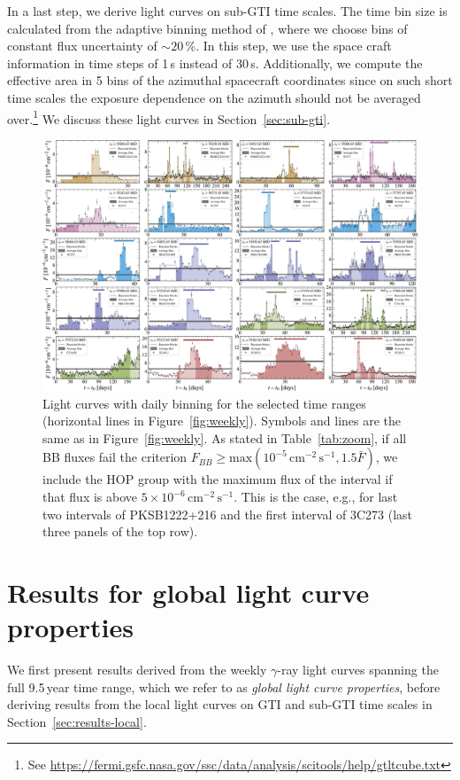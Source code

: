 \documentclass[twocolumn,linenumbers]{aastex62}
\newcommand{\gray}{$\gamma$-ray\xspace}
\begin{document}
In a last step, we derive light curves on sub-GTI time scales. 
The time bin size is calculated from the adaptive binning method of \citet{lott2012}, where we choose bins of constant flux uncertainty of $\sim20\,\%$. 
In this step, we use the space craft information in time steps of 1\,s instead of 30\,s. Additionally, we compute the effective area in 5 bins of the azimuthal spacecraft coordinates since on such short time scales the exposure dependence on the azimuth should not be averaged over.\footnote{See \url{https://fermi.gsfc.nasa.gov/ssc/data/analysis/scitools/help/gtltcube.txt}}
We discuss these light curves in Section~\ref{sec:sub-gti}.


\begin{figure}
    \centering
    \includegraphics[width = .99\linewidth]{figures/lc_daily_tsmin9.pdf}
    \caption{\label{fig:daily} Light curves with daily binning for the selected time ranges (horizontal lines in Figure~\ref{fig:weekly}). Symbols and lines are the same as in Figure~\ref{fig:weekly}. 
    As stated in Table~\ref{tab:zoom}, if all BB fluxes fail the criterion $F_{BB} \geqslant \mathrm{max}(10^{-5}\,\mathrm{cm}^{-2}\,\mathrm{s}^{-1}, 1.5 \bar{F})$, we include the HOP group with the maximum flux of the interval if that flux is above $5\times 10^{-6}\,\mathrm{cm}^{-2}\,\mathrm{s}^{-1}$. This is the case, e.g., for last two intervals of PKSB1222+216 and the first interval of 3C273 (last three panels of the top row).}
\end{figure}

\section{Results for global light curve properties}
\label{sec:results-global}
We first present results derived from the weekly \gray light curves spanning the full 9.5\,year time range, which we refer to as \emph{global light curve properties}, before deriving results from the local light curves on GTI and sub-GTI time scales in Section~\ref{sec:results-local}.
\end{document}
